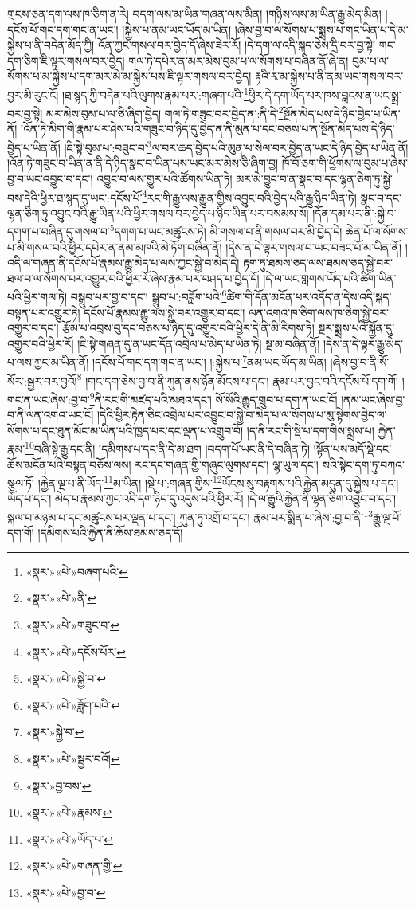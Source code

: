 གྲངས་ཅན་དག་ལས་ཁ་ཅིག་ན་རེ། བདག་ལས་མ་ཡིན་གཞན་ལས་མིན། །གཉིས་ལས་མ་ཡིན་རྒྱུ་མེད་མིན། །དངོས་པོ་གང་དག་གང་ན་ཡང་། །སྐྱེས་པ་ནམ་ཡང་ཡོད་མ་ཡིན། །ཞེས་བྱ་བ་ལ་སོགས་པ་སྨྲས་པ་གང་ཡིན་པ་དེ་མ་སྐྱེས་པ་ནི་བདེན་མོད་ཀྱི། འོན་ཀྱང་གསལ་བར་བྱེད་དོ་ཞེས་ཟེར་རོ། །དེ་དག་ལ་འདི་སྐད་ཅེས་དྲི་བར་བྱ་སྟེ། གང་དག་ཅིག་ཇི་ལྟར་གསལ་བར་བྱེད། གལ་ཏེ་དཔེར་ན་མར་མེས་བུམ་པ་ལ་སོགས་པ་བཞིན་ནོ་ཞེ་ན། བུམ་པ་ལ་སོགས་པ་མ་སྐྱེས་པ་དག་མར་མེ་མ་སྐྱེས་པས་ཇི་ལྟར་གསལ་བར་བྱེད། རྟའི་རྭ་མ་སྐྱེས་པ་ནི་ནམ་ཡང་གསལ་བར་བྱར་མི་རུང་ངོ། །ཐ་སྙད་ཀྱི་བདེན་པའི་ལུགས་རྣམ་པར་:གཞག་པའི་\footnote{«སྣར་»«པེ་»བཞག་པའི་}ཕྱིར་དེ་དག་ཡོད་པར་ཁས་བླངས་ན་ཡང་སྨྲ་བར་བྱ་སྟེ། མར་མེས་བུམ་པ་ལ་ཅི་ཞིག་བྱེད། གལ་ཏེ་གཟུང་བར་བྱེད་ན་:ནི་དེ་\footnote{«སྣར་»«པེ་»ནི་}སྔོན་མེད་པས་དེ་ཉིད་བྱེད་པ་ཡིན་ནོ། །འོན་ཏེ་མིག་གི་རྣམ་པར་ཤེས་པའི་གཟུང་བ་ཉིད་དུ་བྱེད་ན་ནི་མུན་པ་དང་བཅས་པ་ན་སྔོན་མེད་པས་དེ་ཉིད་བྱེད་པ་ཡིན་ནོ། །ཇི་སྟེ་བུམ་པ་:བཟུང་བ་\footnote{«སྣར་»«པེ་»གཟུང་བ་}ལ་བར་ཆད་བྱེད་པའི་མུན་པ་སེལ་བར་བྱེད་ན་ཡང་དེ་ཉིད་བྱེད་པ་ཡིན་ནོ། །འོན་ཏེ་གཟུང་བ་ཡིན་ན་ནི་དེ་ཉིད་སྣང་བ་ཡིན་པས་ཡང་མར་མེས་ཅི་ཞིག་བྱ། ཁོ་བོ་ཅག་གི་ཕྱོགས་ལ་བུམ་པ་ཞེས་བྱ་བ་ཡང་འབྱུང་བ་དང་། འབྱུང་བ་ལས་གྱུར་པའི་ཚོགས་ཡིན་ཏེ། མར་མེ་བྱུང་བ་ན་སྣང་བ་དང་ལྷན་ཅིག་ཏུ་སྐྱེ་བས་དེའི་ཕྱིར་ཐ་སྙད་དུ་ཡང་:དངོས་པོ་\footnote{«སྣར་»«པེ་»དངོས་པོར་}རང་གི་རྒྱུ་ལས་རྒྱུན་གྱིས་འབྱུང་བའི་བྱེད་པའི་རྒྱུ་ཉིད་ཡིན་ཏེ། སྣང་བ་དང་ལྷན་ཅིག་ཏུ་འབྱུང་བའི་རྒྱུ་ཡིན་པའི་ཕྱིར་གསལ་བར་བྱེད་པ་ཉིད་ཡིན་པར་བསམས་སོ། །དོན་དམ་པར་ནི་:སྐྱེ་བ་དགག་པ་བཞིན་དུ་གསལ་བ་\footnote{«སྣར་»«པེ་»སྐྱེ་བ་}དགག་པ་ཡང་མཚུངས་ཏེ། མི་གསལ་བ་ནི་གསལ་བར་མི་བྱེད་དེ། ཆེན་པོ་ལ་སོགས་པ་མི་གསལ་བའི་ཕྱིར་དཔེར་ན་ནམ་མཁའི་མེ་ཏོག་བཞིན་ནོ། །དེས་ན་དེ་ལྟར་གསལ་བ་ཡང་བཟང་པོ་མ་ཡིན་ནོ། །འདི་ལ་གཞན་ནི་དངོས་པོ་རྣམས་རྒྱུ་མེད་པ་ལས་ཀྱང་སྐྱེ་བ་མེད་དེ། རྟག་ཏུ་ཐམས་ཅད་ལས་ཐམས་ཅད་སྐྱེ་བར་ཐལ་བ་ལ་སོགས་པར་འགྱུར་བའི་ཕྱིར་རོ་ཞེས་རྣམ་པར་བཤད་པ་བྱེད་དོ། །དེ་ལ་ཡང་གླགས་ཡོད་པའི་ཚིག་ཡིན་པའི་ཕྱིར་གལ་ཏེ། བསྒྲུབ་པར་བྱ་བ་དང་། སྒྲུབ་པ་:བཟློག་པའི་\footnote{«སྣར་»«པེ་»ཟློག་པའི་}ཚིག་གི་དོན་མངོན་པར་འདོད་ན་དེས་འདི་སྐད་བསྟན་པར་འགྱུར་ཏེ། དངོས་པོ་རྣམས་རྒྱུ་ལས་སྐྱེ་བར་འགྱུར་བ་དང་། ལན་འགའ་ཁ་ཅིག་ལས་ཁ་ཅིག་སྐྱེ་བར་འགྱུར་བ་དང་། རྩོམ་པ་འབྲས་བུ་དང་བཅས་པ་ཉིད་དུ་འགྱུར་བའི་ཕྱིར་དེ་ནི་མི་རིགས་ཏེ། སྔར་སྨྲས་པའི་སྐྱོན་དུ་འགྱུར་བའི་ཕྱིར་རོ། །ཇི་སྟེ་གཞན་དུ་ན་ཡང་དོན་འབྲེལ་པ་མེད་པ་ཡིན་ཏེ། སྔ་མ་བཞིན་ནོ། །དེས་ན་དེ་ལྟར་རྒྱུ་མེད་པ་ལས་ཀྱང་མ་ཡིན་ནོ། །དངོས་པོ་གང་དག་གང་ན་ཡང་། །:སྐྱེས་པ་\footnote{«སྣར་»སྐྱེ་བ་}ནམ་ཡང་ཡོད་མ་ཡིན། །ཞེས་བྱ་བ་ནི་སོ་སོར་:སྦྱར་བར་བྱའོ།\footnote{«སྣར་»«པེ་»སྦྱར་བའོ།} །གང་དག་ཅེས་བྱ་བ་ནི་ཀུན་ནས་ཉོན་མོངས་པ་དང་། རྣམ་པར་བྱང་བའི་དངོས་པོ་དག་གོ། །གང་ན་ཡང་ཞེས་:བྱ་བ་\footnote{«སྣར་»བྱ་བས་}ནི་རང་གི་མཛད་པའི་མཐའ་དང་། སོ་སོའི་རྒྱུད་གྲུབ་པ་དག་ན་ཡང་ངོ། །ནམ་ཡང་ཞེས་བྱ་བ་ནི་ལན་འགའ་ཡང་ངོ། །དེའི་ཕྱིར་རྟེན་ཅིང་འབྲེལ་པར་འབྱུང་བ་སྐྱེ་བ་མེད་པ་ལ་སོགས་པ་མུ་སྟེགས་བྱེད་ལ་སོགས་པ་དང་ཐུན་མོང་མ་ཡིན་པའི་ཁྱད་པར་དང་ལྡན་པ་འགྲུབ་བོ། །ད་ནི་རང་གི་སྡེ་པ་དག་གིས་སྨྲས་པ། རྐྱེན་རྣམ་\footnote{«སྣར་»«པེ་»རྣམས་}བཞི་སྟེ་རྒྱུ་དང་ནི། །དམིགས་པ་དང་ནི་དེ་མ་ཐག །བདག་པོ་ཡང་ནི་དེ་བཞིན་ཏེ། །སྟོན་པས་མདོ་སྡེ་དང་ཆོས་མངོན་པའི་བསྟན་བཅོས་ལས། རང་དང་གཞན་གྱི་གཞུང་ལུགས་དང་། ལྷ་ཡུལ་དང་། སའི་སྟེང་དག་ཏུ་བཀའ་སྩལ་ཏོ། །རྐྱེན་ལྔ་པ་ནི་ཡོད་\footnote{«སྣར་»«པེ་»ཡོད་པ་}མ་ཡིན། །སྡེ་པ་:གཞན་གྱིས་\footnote{«སྣར་»«པེ་»གཞན་གྱི་}ཡོངས་སུ་བརྟགས་པའི་རྐྱེན་མདུན་དུ་སྐྱེས་པ་དང་། ཡོད་པ་དང་། མེད་པ་རྣམས་ཀྱང་འདི་དག་ཉིད་དུ་འདུས་པའི་ཕྱིར་རོ། །དེ་ལ་རྒྱུའི་རྐྱེན་ནི་ལྷན་ཅིག་འབྱུང་བ་དང་། སྐལ་བ་མཉམ་པ་དང་མཚུངས་པར་ལྡན་པ་དང་། ཀུན་ཏུ་འགྲོ་བ་དང་། རྣམ་པར་སྨིན་པ་ཞེས་:བྱ་བ་ནི་\footnote{«སྣར་»«པེ་»བྱ་བ་}རྒྱུ་ལྔ་པོ་དག་གོ། །དམིགས་པའི་རྐྱེན་ནི་ཆོས་ཐམས་ཅད་དོ། 